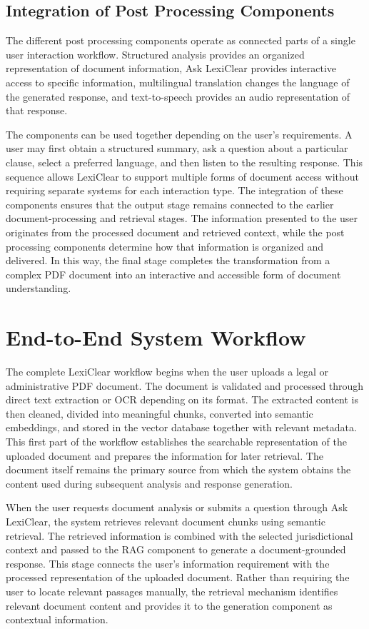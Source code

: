 \documentclass[12pt,a4paper,oneside]{report}
\begin{document}
\subsection{Integration of Post Processing Components}

The different post processing components operate as connected parts of a single user interaction workflow. Structured analysis provides an organized representation of document information, Ask LexiClear provides interactive access to specific information, multilingual translation changes the language of the generated response, and text-to-speech provides an audio representation of that response.

The components can be used together depending on the user's requirements. A user may first obtain a structured summary, ask a question about a particular clause, select a preferred language, and then listen to the resulting response. This sequence allows LexiClear to support multiple forms of document access without requiring separate systems for each interaction type. The integration of these components ensures that the output stage remains connected to the earlier document-processing and retrieval stages. The information presented to the user originates from the processed document and retrieved context, while the post processing components determine how that information is organized and delivered. In this way, the final stage completes the transformation from a complex PDF document into an interactive and accessible form of document understanding.
\section{End-to-End System Workflow}

The complete LexiClear workflow begins when the user uploads a legal or
administrative PDF document. The document is validated and processed through
direct text extraction or OCR depending on its format. The extracted content
is then cleaned, divided into meaningful chunks, converted into semantic
embeddings, and stored in the vector database together with relevant
metadata. This first part of the workflow establishes the searchable
representation of the uploaded document and prepares the information for
later retrieval. The document itself remains the primary source from which
the system obtains the content used during subsequent analysis and response
generation.

When the user requests document analysis or submits a question through Ask
LexiClear, the system retrieves relevant document chunks using semantic
retrieval. The retrieved information is combined with the selected
jurisdictional context and passed to the RAG component to generate a
document-grounded response. This stage connects the user's information
requirement with the processed representation of the uploaded document.
Rather than requiring the user to locate relevant passages manually, the
retrieval mechanism identifies relevant document content and provides it to
the generation component as contextual information.
\end{document}
